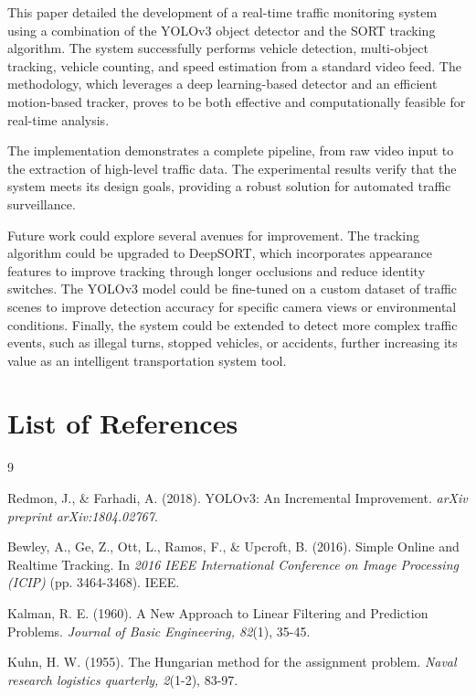 \documentclass{article}
\begin{document}
This paper detailed the development of a real-time traffic monitoring system using a combination of the YOLOv3 object detector and the SORT tracking algorithm. The system successfully performs vehicle detection, multi-object tracking, vehicle counting, and speed estimation from a standard video feed. The methodology, which leverages a deep learning-based detector and an efficient motion-based tracker, proves to be both effective and computationally feasible for real-time analysis.

The implementation demonstrates a complete pipeline, from raw video input to the extraction of high-level traffic data. The experimental results verify that the system meets its design goals, providing a robust solution for automated traffic surveillance.

Future work could explore several avenues for improvement. The tracking algorithm could be upgraded to DeepSORT, which incorporates appearance features to improve tracking through longer occlusions and reduce identity switches. The YOLOv3 model could be fine-tuned on a custom dataset of traffic scenes to improve detection accuracy for specific camera views or environmental conditions. Finally, the system could be extended to detect more complex traffic events, such as illegal turns, stopped vehicles, or accidents, further increasing its value as an intelligent transportation system tool.

\section{List of References}

\begin{thebibliography}{9}

Redmon, J., \& Farhadi, A. (2018). YOLOv3: An Incremental Improvement. \textit{arXiv preprint arXiv:1804.02767}.

Bewley, A., Ge, Z., Ott, L., Ramos, F., \& Upcroft, B. (2016). Simple Online and Realtime Tracking. In \textit{2016 IEEE International Conference on Image Processing (ICIP)} (pp. 3464-3468). IEEE.

Kalman, R. E. (1960). A New Approach to Linear Filtering and Prediction Problems. \textit{Journal of Basic Engineering, 82}(1), 35-45.

Kuhn, H. W. (1955). The Hungarian method for the assignment problem. \textit{Naval research logistics quarterly, 2}(1-2), 83-97.

\end{thebibliography}
\end{document}
